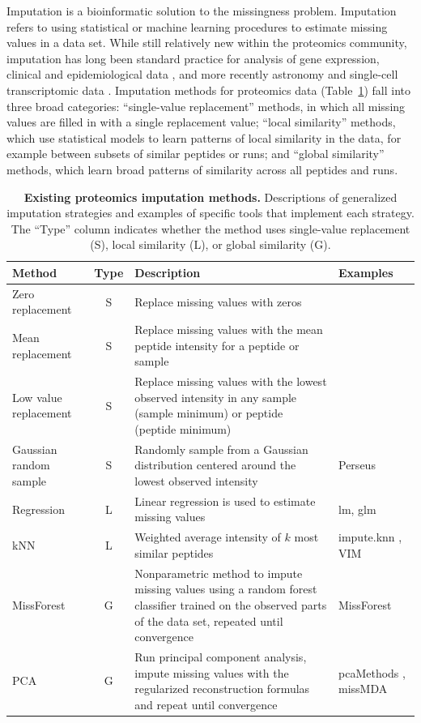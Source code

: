 \documentclass{article}
\begin{document}
Imputation is a bioinformatic solution to the missingness problem. Imputation refers to using statistical or machine learning procedures to estimate missing values in a data set. While still relatively new within the proteomics community, imputation has long been standard practice for analysis of gene expression, \cite{knn-impute} clinical and epidemiological data \cite{multi-impute-clinical}, and more recently astronomy \cite{astro-impute1, astro-impute2} and single-cell transcriptomic data \cite{ALRA, magic-scRNA}. Imputation methods for proteomics data (Table~\ref{tab:method-descrip}) fall into three broad categories: ``single-value replacement'' methods, in which all missing values are filled in with a single replacement value; ``local similarity'' methods, which use statistical models to learn patterns of local similarity in the data, for example between subsets of similar peptides or runs; and ``global similarity'' methods, which learn broad patterns of similarity across all peptides and runs.

\begin{table}
  \centering
  \scriptsize
  \begin{tabular}{lcp{3in}p{1in}}
    \hline
    Method & Type & Description & Examples \\
    \hline
    Zero replacement & S & Replace missing values with zeros & \\
    Mean replacement & S & Replace missing values with the mean peptide intensity for a peptide or sample & \\
    Low value replacement & S & Replace missing values with the lowest observed intensity in any sample (sample minimum) or peptide (peptide minimum) & \\
    Gaussian random sample & S & Randomly sample from a Gaussian distribution centered around the lowest observed intensity & Perseus \cite{Perseus} \\
    Regression & L & Linear regression is used to estimate missing values & lm, glm \\
   kNN & L & Weighted average intensity of $k$ most similar peptides & impute.knn \cite{knn-impute}, VIM \cite{VIM} \\
    MissForest & G & Nonparametric method to impute missing values
using a random forest classifier trained on the observed parts of the data set,
repeated until convergence & MissForest \cite{missForest} \\
    PCA & G & Run principal component analysis, impute missing values with the regularized reconstruction formulas and repeat until convergence & pcaMethods \cite{pcaMethods}, missMDA \cite{missMDA} \\
     \hline
  \end{tabular}
  \caption{{\bf Existing proteomics imputation methods.} Descriptions of generalized imputation strategies and examples of specific tools that implement each strategy.  The ``Type'' column indicates whether the method uses single-value replacement (S), local similarity (L), or global similarity (G).
    \label{tab:method-descrip}}
\end{table}
\end{document}
